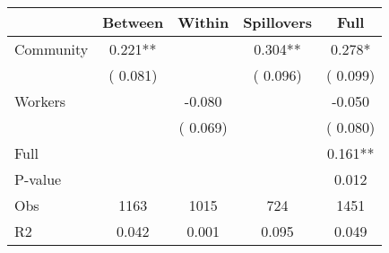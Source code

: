 
\begin{tabular}{l*{4}{c}}\hline&\multicolumn{1}{c}{Between}&\multicolumn{1}{c}{Within}&\multicolumn{1}{c}{Spillovers}&\multicolumn{1}{c}{Full}\\ \hline
 Community             &              0.221**      &                                               &        0.304** &         0.278*                            \\ 
                               &        (       0.081)           &                                       &       (       0.096)     &      (       0.099)                                           \\ 
 Workers       &                                               &       -0.080    &                                &            -0.050                            \\ 
                               &                                               & (       0.069)                  &                                        &      (       0.080)                                           \\ 
\hline                                                                                                                                                                                                                                            
 Full                  &                                               &                                               &                                        &             0.161**                                     \\ 
 P-value               &                                               &                                               &                                        &             0.012                                           \\ 
 Obs                   &               1163               &       1015                       &       724                &              1451                                               \\ 
 R2                    &                      0.042              &              0.001                      &              0.095               &                     0.049                                              \\ 
\hline \end{tabular}                                                                                                                                                                                                              